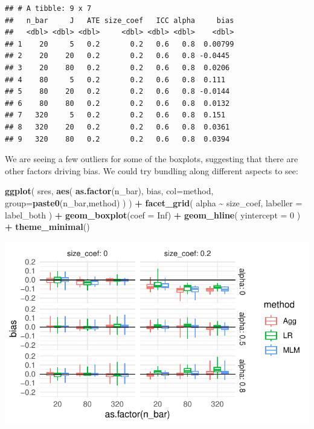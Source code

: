 \documentclass[
]{book}
\newenvironment{Shaded}{\begin{snugshade}}{\end{snugshade}}
\newcommand{\AttributeTok}[1]{\textcolor[rgb]{0.13,0.29,0.53}{#1}}
\newcommand{\ConstantTok}[1]{\textcolor[rgb]{0.56,0.35,0.01}{#1}}
\newcommand{\DecValTok}[1]{\textcolor[rgb]{0.00,0.00,0.81}{#1}}
\newcommand{\FunctionTok}[1]{\textcolor[rgb]{0.13,0.29,0.53}{\textbf{#1}}}
\newcommand{\NormalTok}[1]{#1}
\newcommand{\SpecialCharTok}[1]{\textcolor[rgb]{0.81,0.36,0.00}{\textbf{#1}}}
\begin{document}
\begin{verbatim}
## # A tibble: 9 x 7
##   n_bar     J   ATE size_coef   ICC alpha     bias
##   <dbl> <dbl> <dbl>     <dbl> <dbl> <dbl>    <dbl>
## 1    20     5   0.2       0.2   0.6   0.8  0.00799
## 2    20    20   0.2       0.2   0.6   0.8 -0.0445 
## 3    20    80   0.2       0.2   0.6   0.8  0.0206 
## 4    80     5   0.2       0.2   0.6   0.8  0.111  
## 5    80    20   0.2       0.2   0.6   0.8 -0.0144 
## 6    80    80   0.2       0.2   0.6   0.8  0.0132 
## 7   320     5   0.2       0.2   0.6   0.8  0.151  
## 8   320    20   0.2       0.2   0.6   0.8  0.0361 
## 9   320    80   0.2       0.2   0.6   0.8  0.0394
\end{verbatim}

We are seeing a few outliers for some of the boxplots, suggesting that there are other factors driving bias. We could try bundling along different aspects to see:

\begin{Shaded}
\begin{Highlighting}[]
\FunctionTok{ggplot}\NormalTok{( sres, }\FunctionTok{aes}\NormalTok{( }\FunctionTok{as.factor}\NormalTok{(n\_bar), bias, }\AttributeTok{col=}\NormalTok{method, }\AttributeTok{group=}\FunctionTok{paste0}\NormalTok{(n\_bar,method) ) ) }\SpecialCharTok{+}
  \FunctionTok{facet\_grid}\NormalTok{( alpha }\SpecialCharTok{\textasciitilde{}}\NormalTok{  size\_coef, }\AttributeTok{labeller =}\NormalTok{ label\_both ) }\SpecialCharTok{+}
  \FunctionTok{geom\_boxplot}\NormalTok{(}\AttributeTok{coef =} \ConstantTok{Inf}\NormalTok{) }\SpecialCharTok{+}
  \FunctionTok{geom\_hline}\NormalTok{( }\AttributeTok{yintercept =} \DecValTok{0}\NormalTok{ ) }\SpecialCharTok{+}
  \FunctionTok{theme\_minimal}\NormalTok{()}
\end{Highlighting}
\end{Shaded}

\begin{center}\includegraphics[width=0.75\linewidth]{Designing-Simulations-in-R_files/figure-latex/clusterRCT_plot_bias_v2-1} \end{center}
\end{document}
